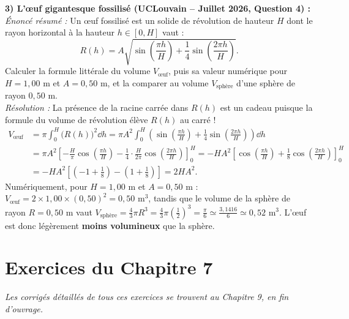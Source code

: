\begin{exemple}
\medskip
\textbf{3) L'œuf gigantesque fossilisé (UCLouvain -- Juillet 2026, Question 4) :}\\
\emph{Énoncé résumé :} Un œuf fossilisé est un solide de révolution de hauteur $H$ dont le rayon horizontal à la hauteur $h \in [0, H]$ vaut :
\[
    R(h) = A\sqrt{\sin\left(\frac{\pi h}{H}\right) + \frac{1}{4}\sin\left(\frac{2\pi h}{H}\right)}.
\]
Calculer la formule littérale du volume $V_{\text{œuf}}$, puis sa valeur numérique pour $H = 1,00\text{ m}$ et $A = 0,50\text{ m}$, et la comparer au volume $V_{\text{sphère}}$ d'une sphère de rayon $0,50\text{ m}$.\\
\emph{Résolution :} La présence de la racine carrée dans $R(h)$ est un cadeau puisque la formule du volume de révolution élève $R(h)$ au carré !
\begin{align*}
    V_{\text{œuf}} &= \pi \int_0^H \bigl(R(h)\bigr)^2\dd h = \pi A^2 \int_0^H \left(\sin\left(\frac{\pi h}{H}\right) + \frac{1}{4}\sin\left(\frac{2\pi h}{H}\right)\right)\dd h \\
    &= \pi A^2 \left[-\frac{H}{\pi}\cos\left(\frac{\pi h}{H}\right) - \frac{1}{4}\cdot\frac{H}{2\pi}\cos\left(\frac{2\pi h}{H}\right)\right]_0^H = -H A^2 \left[\cos\left(\frac{\pi h}{H}\right) + \frac{1}{8}\cos\left(\frac{2\pi h}{H}\right)\right]_0^H \\
    &= -H A^2 \left[\left(-1 + \frac{1}{8}\right) - \left(1 + \frac{1}{8}\right)\right] = \boxed{2 H A^2}.
\end{align*}
Numériquement, pour $H = 1,00\text{ m}$ et $A = 0,50\text{ m}$ : $\boxed{V_{\text{œuf}} = 2 \times 1,00 \times (0,50)^2 = 0,50\text{ m}^3}$, tandis que le volume de la sphère de rayon $R = 0,50\text{ m}$ vaut $\boxed{V_{\text{sphère}} = \frac{4}{3}\pi R^3 = \frac{4}{3}\pi\left(\frac{1}{2}\right)^3 = \frac{\pi}{6} \simeq \frac{3,1416}{6} \simeq 0,52\text{ m}^3}$. L'œuf est donc légèrement \textbf{moins volumineux} que la sphère.
\end{exemple}

\section{Exercices du Chapitre 7}

\emph{Les corrigés détaillés de tous ces exercices se trouvent au Chapitre 9, en fin d'ouvrage.}

